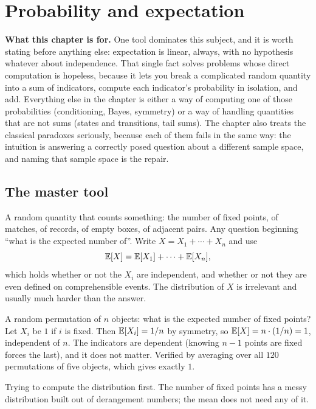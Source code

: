 \chapter{Probability and expectation}

\begin{orient}
\textbf{What this chapter is for.} One tool dominates this subject, and it is worth stating before anything else: expectation is linear, always, with no hypothesis whatever about independence. That single fact solves problems whose direct computation is hopeless, because it lets you break a complicated random quantity into a sum of indicators, compute each indicator's probability in isolation, and add. Everything else in the chapter is either a way of computing one of those probabilities (conditioning, Bayes, symmetry) or a way of handling quantities that are not sums (states and transitions, tail sums). The chapter also treats the classical paradoxes seriously, because each of them fails in the same way: the intuition is answering a correctly posed question about a different sample space, and naming that sample space is the repair.
\end{orient}

\section{The master tool}

\cue A random quantity that counts something: the number of fixed points, of matches, of records, of empty boxes, of adjacent pairs. Any question beginning ``what is the expected number of''.
\method Write $X=X_{1}+\cdots+X_{n}$ and use
\[
\mathbb{E}[X]=\mathbb{E}[X_{1}]+\cdots+\mathbb{E}[X_{n}],
\]
which holds whether or not the $X_{i}$ are independent, and whether or not they are even defined on comprehensible events. The distribution of $X$ is irrelevant and usually much harder than the answer.

\begin{worked}
A random permutation of $n$ objects: what is the expected number of fixed points? Let $X_{i}$ be $1$ if $i$ is fixed. Then $\mathbb{E}[X_{i}]=1/n$ by symmetry, so $\mathbb{E}[X]=n\cdot(1/n)=1$, independent of $n$. The indicators are dependent (knowing $n-1$ points are fixed forces the last), and it does not matter. Verified by averaging over all $120$ permutations of five objects, which gives exactly $1$.
\end{worked}

\begin{trap}
Trying to compute the distribution first. The number of fixed points has a messy distribution built out of derangement numbers; the mean does not need any of it.
\end{trap}

